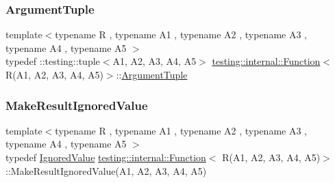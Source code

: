 \subsubsection{\texorpdfstring{ArgumentTuple}{ArgumentTuple}}
{\footnotesize\ttfamily template$<$typename R , typename A1 , typename A2 , typename A3 , typename A4 , typename A5 $>$ \\
typedef \+::testing\+::tuple$<$A1, A2, A3, A4, A5$>$ \mbox{\hyperlink{structtesting_1_1internal_1_1_function}{testing\+::internal\+::\+Function}}$<$ R(A1, A2, A3, A4, A5)$>$\+::\mbox{\hyperlink{structtesting_1_1internal_1_1_function_3_01_r_07_08_4_ad483c3128c470d8cdb55c3ac1c575c11}{Argument\+Tuple}}}

\mbox{\label{structtesting_1_1internal_1_1_function_3_01_r_07_a1_00_01_a2_00_01_a3_00_01_a4_00_01_a5_08_4_a552ce4ec27e2d09fa1c133c66f72d7b3}} 
\subsubsection{\texorpdfstring{MakeResultIgnoredValue}{MakeResultIgnoredValue}}
{\footnotesize\ttfamily template$<$typename R , typename A1 , typename A2 , typename A3 , typename A4 , typename A5 $>$ \\
typedef \mbox{\hyperlink{classtesting_1_1internal_1_1_ignored_value}{Ignored\+Value}} \mbox{\hyperlink{structtesting_1_1internal_1_1_function}{testing\+::internal\+::\+Function}}$<$ R(A1, A2, A3, A4, A5)$>$\+::Make\+Result\+Ignored\+Value(A1, A2, A3, A4, A5)}

\mbox{\label{structtesting_1_1internal_1_1_function_3_01_r_07_a1_00_01_a2_00_01_a3_00_01_a4_00_01_a5_08_4_a2903acde18de33d756eef4d43d843c04}} 
